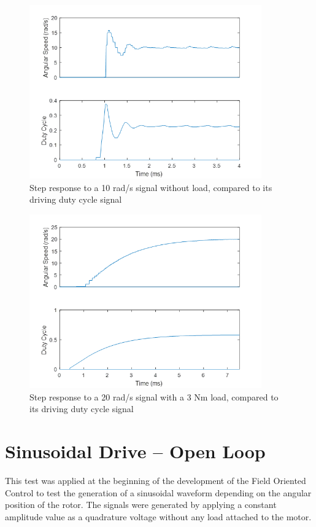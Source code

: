 \begin{figure}[h!p]
\centering
\includegraphics[width=10cm]{Images/plots/plot_6.png} 
\caption[Step response to a 10 rad/s signal without load, compared to its driving duty cycle signal]{Step response to a 10 rad/s signal without load, compared to its driving duty cycle signal}
\label{fig:plot6}
\end{figure}

\begin{figure}[h!p]
\centering
\includegraphics[width=10cm]{Images/plots/plot_7.png} 
\caption[Step response to a 20 rad/s signal with a 3 Nm load, compared to its driving duty cycle signal]{Step response to a 20 rad/s signal with a 3 Nm load, compared to its driving duty cycle signal}
\label{fig:plot7}
\end{figure}

\clearpage
\section{Sinusoidal Drive -- Open Loop}

This test was applied at the beginning of the development of the Field Oriented Control to test the generation of a sinusoidal waveform depending on the angular position of the rotor. The signals were generated by applying a constant amplitude value as a quadrature voltage without any load attached to the motor.

